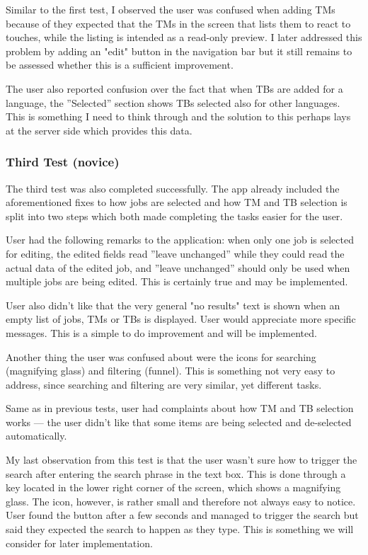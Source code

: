 Similar to the first test, I observed the user was confused when adding TMs because of they expected that the TMs in the screen that lists them to react to touches, while the listing is intended as a read-only preview. I later addressed this problem by adding an "edit" button in the navigation bar but it still remains to be assessed whether this is a sufficient improvement.

The user also reported confusion over the fact that when TBs are added for a language, the ''Selected'' section shows TBs selected also for other languages. This is something I need to think through and the solution to this perhaps lays at the server side which provides this data.


\subsubsection{Third Test (novice)}

The third test was also completed successfully. The app already included the aforementioned fixes to how jobs are selected and how TM and TB selection is split into two steps which both made completing the tasks easier for the user. 

User had the following remarks to the application: when only one job is selected for editing, the edited fields read ''leave unchanged'' while they could read the actual data of the edited job, and ''leave unchanged'' should only be used when multiple jobs are being edited. This is certainly true and may be implemented. 

User also didn't like that the very general "no results" text is shown when an empty list of jobs, TMs or TBs is displayed. User would appreciate more specific messages. This is a simple to do improvement and will be implemented.

Another thing the user was confused about were the icons for searching (magnifying glass) and filtering (funnel). This is something not very easy to address, since searching and filtering are very similar, yet different tasks.

Same as in previous tests, user had complaints about how TM and TB selection works --- the user didn't like that some items are being selected and de-selected automatically.

My last observation from this test is that the user wasn't sure how to trigger the search after entering the search phrase in the text box. This is done through a key located in the lower right corner of the screen, which shows a magnifying glass. The icon, however, is rather small and therefore not always easy to notice. User found the button after a few seconds and managed to trigger the search but said they expected the search to happen as they type. This is something we will consider for later implementation.

